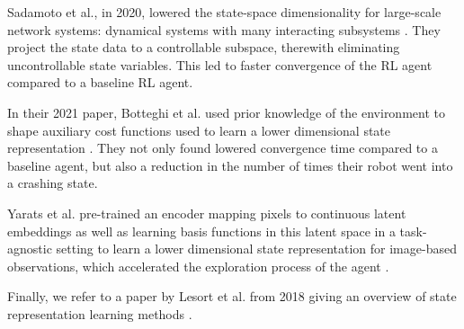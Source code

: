 Sadamoto et al., in 2020, lowered the state-space dimensionality for large-scale network systems: dynamical systems with many interacting subsystems \cite{project_matrix}. They project the state data to a controllable subspace, therewith eliminating uncontrollable state variables. This led to faster convergence of the RL agent compared to a baseline RL agent.

In their 2021 paper, Botteghi et al. used prior knowledge of the environment to shape auxiliary cost functions used to learn a lower dimensional state representation \cite{priors}. They not only found lowered convergence time compared to a baseline agent, but also a reduction in the number of times their robot went into a crashing state.

Yarats et al. pre-trained an encoder mapping pixels to continuous latent embeddings as well as learning basis functions in this latent space in a task-agnostic setting to learn a lower dimensional state representation for image-based observations, which accelerated the exploration process of the agent \cite{prototypical}.

Finally, we refer to a paper by Lesort et al. from 2018 giving an overview of state representation learning methods \cite{representation_overview}.

